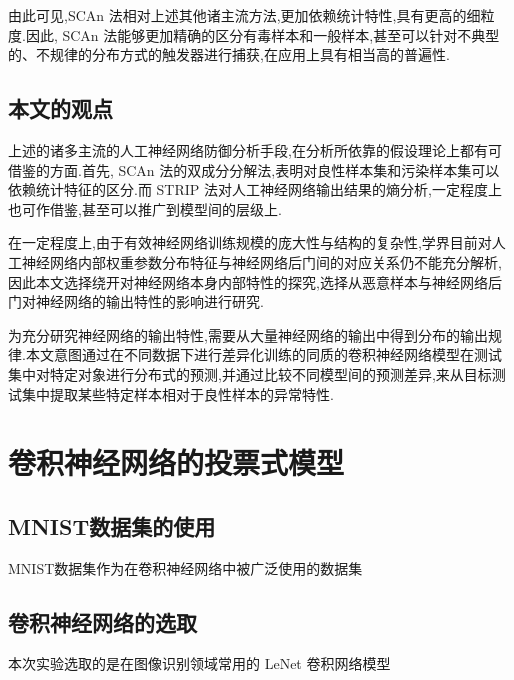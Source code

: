 由此可见,SCAn 法相对上述其他诸主流方法,更加依赖统计特性,具有更高的细粒度.因此, SCAn 法能够更加精确的区分有毒样本和一般样本,甚至可以针对不典型的、不规律的分布方式的触发器进行捕获,在应用上具有相当高的普遍性.

\section{本文的观点}

上述的诸多主流的人工神经网络防御分析手段,在分析所依靠的假设理论上都有可借鉴的方面.首先, SCAn 法的双成分分解法,表明对良性样本集和污染样本集可以依赖统计特征的区分.而 STRIP 法对人工神经网络输出结果的熵分析,一定程度上也可作借鉴,甚至可以推广到模型间的层级上.

在一定程度上,由于有效神经网络训练规模的庞大性与结构的复杂性,学界目前对人工神经网络内部权重参数分布特征与神经网络后门间的对应关系仍不能充分解析,因此本文选择绕开对神经网络本身内部特性的探究,选择从恶意样本与神经网络后门对神经网络的输出特性的影响进行研究.

为充分研究神经网络的输出特性,需要从大量神经网络的输出中得到分布的输出规律.本文意图通过在不同数据下进行差异化训练的同质的卷积神经网络模型在测试集中对特定对象进行分布式的预测,并通过比较不同模型间的预测差异,来从目标测试集中提取某些特定样本相对于良性样本的异常特性.

\chapter{卷积神经网络的投票式模型}

\section{MNIST数据集的使用}

MNIST数据集作为在卷积神经网络中被广泛使用的数据集

\section{卷积神经网络的选取}

本次实验选取的是在图像识别领域常用的 LeNet 卷积网络模型